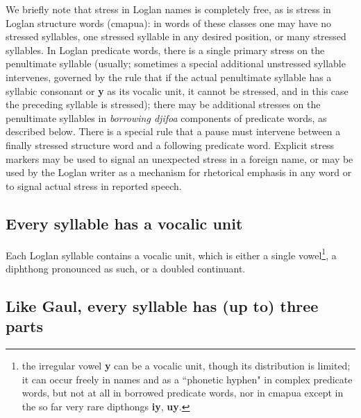 \documentclass[12pt]{book}
\begin{document}
We briefly note that stress in Loglan names is completely free, as is stress in Loglan structure words (cmapua):  in words of these classes one may have no stressed syllables, one stressed syllable in any desired position, or many stressed syllables.  In Loglan predicate words, there is a single primary stress on the penultimate syllable (usually; sometimes a special additional unstressed syllable intervenes, governed by the rule that if the actual penultimate syllable has a syllabic consonant or {\bf y} as its vocalic unit, it cannot be stressed, and in this case the preceding syllable is stressed);  there may be additional stresses
on the penultimate syllables in {\em borrowing djifoa\/} components of predicate words, as described below.  There is a special rule that a pause must intervene between a finally stressed structure word and a following predicate word.  Explicit stress markers may be used to signal an unexpected stress in a foreign name, or may be used by the Loglan writer as a mechanism for rhetorical emphasis in any word or to signal actual stress in reported speech.

\subsection{Every syllable has  a vocalic unit}

Each Loglan syllable contains a vocalic unit, which is either a single vowel\footnote{the irregular vowel {\bf y} can be a vocalic unit, though its distribution is limited; it can occur freely in names and as a ``phonetic hyphen"  in complex predicate words, but  not at all  in  borrowed predicate words, nor in cmapua except in the so far very rare dipthongs {\bf iy}, {\bf uy}.}, a diphthong pronounced as such, or a doubled continuant.


\subsection{Like Gaul, every syllable has (up to) three parts}
\end{document}
